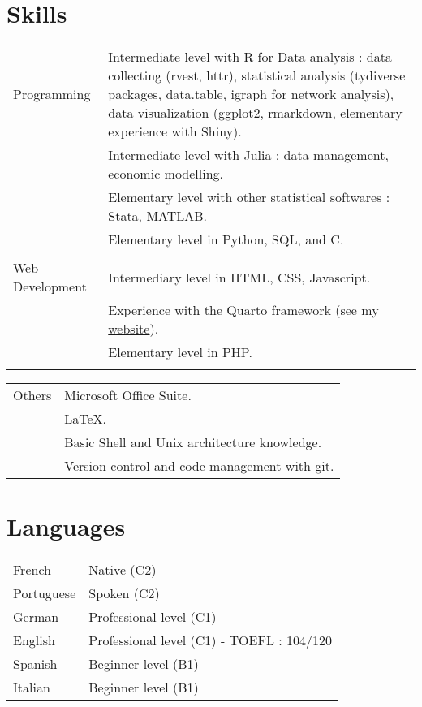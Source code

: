 \documentclass[a4paper,12pt]{article}
\begin{document}
\section{Skills}
\begin{tabularx}{\linewidth}{@{}l X@{}}
Programming & Intermediate level with R for Data analysis : data collecting (rvest, httr), 
statistical analysis (tydiverse packages, data.table, igraph for network analysis), 
data visualization (ggplot2, rmarkdown, elementary experience with Shiny). \\ 
& Intermediate level with Julia : data management, economic modelling. \\
& Elementary level with other statistical softwares : Stata, MATLAB. \\
& Elementary level in Python, SQL, and C. \\
& \\
Web Development  &  Intermediary level in HTML, CSS, Javascript. \\
& Experience with the Quarto framework (see my \href{https://www.paulogcd.com}{website}). \\
& Elementary level in PHP.\\
& \\
\end{tabularx}

\begin{tabularx}{\linewidth}{@{}l X@{}}
Others \quad \quad \quad \quad \quad \quad & Microsoft Office Suite. \\
&  \LaTeX. \\
& Basic Shell and Unix architecture knowledge. \\
& Version control and code management with git. \\
\end{tabularx}

\section{Languages}
\begin{tabularx}{\linewidth}{@{}l X@{}}
French &  \normalsize{Native (C2)}\\
Portuguese &  \normalsize{Spoken (C2)}\\
German &  \normalsize{Professional level (C1)}\\  
English &  \normalsize{Professional level (C1) - TOEFL : 104/120}\\ 
Spanish & \normalsize{Beginner level (B1)}\\ 
Italian & \normalsize{Beginner level (B1)}\\ 
\end{tabularx}

\vfill
{}
\end{document}
